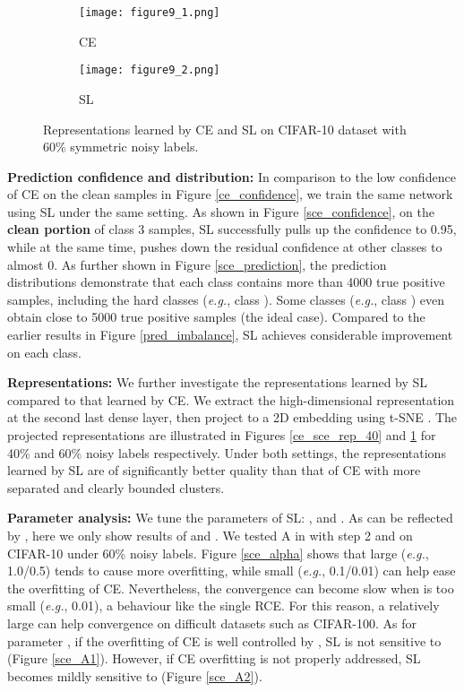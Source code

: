 \documentclass[10pt,twocolumn,letterpaper]{article}
\begin{document}
\begin{figure}[!t]
	\centering
	\begin{subfigure}{0.49\linewidth}
		\texttt{[image: figure9\_1.png]}
		\caption{CE}
\end{subfigure}
	\begin{subfigure}{0.49\linewidth} 
		\texttt{[image: figure9\_2.png]}
		\caption{SL} 
\end{subfigure}
	\vspace{-0.1 in}
	\caption{Representations learned by CE and SL on CIFAR-10 dataset with 60\% symmetric noisy labels.}
	\label{fig:rep_ce_sce_60}
	\vspace{-0.15 in}
\end{figure}


\noindent\textbf{Prediction confidence and distribution:} 
In comparison to the low confidence of CE on the clean samples in Figure \ref{ce_confidence}, we train the same network using SL under the same setting. As shown in Figure \ref{sce_confidence}, on the \textbf{clean portion} of class 3 samples, SL successfully pulls up the confidence to 0.95, while at the same time, pushes down the residual confidence at other classes to almost 0. As further shown in Figure \ref{sce_prediction}, the prediction distributions demonstrate that each class contains more than 4000 true positive samples, including the hard classes (\textit{e.g.}, class ).  Some classes (\textit{e.g.}, class ) even obtain close to 5000 true positive samples (the ideal case). Compared to the earlier results in Figure \ref{pred_imbalance}, SL achieves considerable improvement on each class. 

\noindent\textbf{Representations:} 
We further investigate the representations learned by SL compared to that learned by CE. We extract the high-dimensional representation at the second last dense layer, then project to a 2D embedding using t-SNE \cite{maaten2008visualizing}. The projected representations are illustrated in Figures \ref{ce_sce_rep_40} and \ref{fig:rep_ce_sce_60} for 40\% and 60\% noisy labels respectively. Under both settings, the representations learned by SL are of significantly better quality than that of CE with more separated and clearly bounded clusters.  

\noindent\textbf{Parameter analysis:}
We tune the parameters of SL: ,  and . As  can be reflected by , here we only show results of  and . We tested A in  with step 2 and  on CIFAR-10 under 60\% noisy labels. Figure \ref{sce_alpha} shows that large  (\textit{e.g.}, 1.0/0.5) tends to cause more overfitting, while small  (\textit{e.g.}, 0.1/0.01) can help ease the overfitting of CE. Nevertheless, the convergence can become slow when  is too small (\textit{e.g.}, 0.01), a behaviour like the single RCE. For this reason, a relatively large  can help convergence on difficult datasets such as CIFAR-100. As for parameter , if the overfitting of CE is well controlled by , SL is not sensitive to  (Figure \ref{sce_A1}). However, if CE overfitting is not properly addressed, SL becomes mildly sensitive to  (Figure \ref{sce_A2}).
\end{document}
